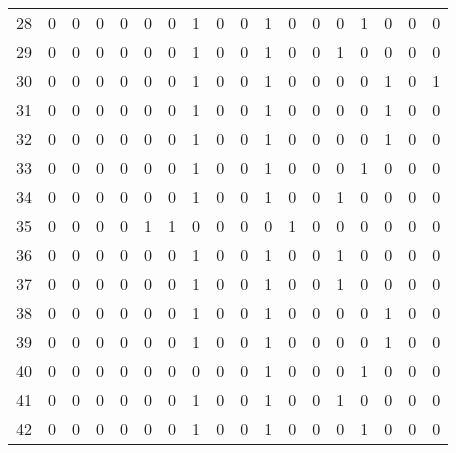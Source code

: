 \begin{tabular}{|c|c|c|c|c|c|c|c|c|c|c|c|c|c|c|c|c|c|}
28    &    0 &    0 &    0 &   0 &        0 &        0 &    1 &    0 &    0 &    1 &    0 &    0 &    0 &    1 &     0 &    0 &     0 \\
29    &    0 &    0 &    0 &   0 &        0 &        0 &    1 &    0 &    0 &    1 &    0 &    0 &    1 &    0 &     0 &    0 &     0 \\
30    &    0 &    0 &    0 &   0 &        0 &        0 &    1 &    0 &    0 &    1 &    0 &    0 &    0 &    0 &     1 &    0 &     1 \\
31    &    0 &    0 &    0 &   0 &        0 &        0 &    1 &    0 &    0 &    1 &    0 &    0 &    0 &    0 &     1 &    0 &     0 \\
32    &    0 &    0 &    0 &   0 &        0 &        0 &    1 &    0 &    0 &    1 &    0 &    0 &    0 &    0 &     1 &    0 &     0 \\
33    &    0 &    0 &    0 &   0 &        0 &        0 &    1 &    0 &    0 &    1 &    0 &    0 &    0 &    1 &     0 &    0 &     0 \\
34    &    0 &    0 &    0 &   0 &        0 &        0 &    1 &    0 &    0 &    1 &    0 &    0 &    1 &    0 &     0 &    0 &     0 \\
35    &    0 &    0 &    0 &   0 &        1 &        1 &    0 &    0 &    0 &    0 &    1 &    0 &    0 &    0 &     0 &    0 &     0 \\
36    &    0 &    0 &    0 &   0 &        0 &        0 &    1 &    0 &    0 &    1 &    0 &    0 &    1 &    0 &     0 &    0 &     0 \\
37    &    0 &    0 &    0 &   0 &        0 &        0 &    1 &    0 &    0 &    1 &    0 &    0 &    1 &    0 &     0 &    0 &     0 \\
38    &    0 &    0 &    0 &   0 &        0 &        0 &    1 &    0 &    0 &    1 &    0 &    0 &    0 &    0 &     1 &    0 &     0 \\
39    &    0 &    0 &    0 &   0 &        0 &        0 &    1 &    0 &    0 &    1 &    0 &    0 &    0 &    0 &     1 &    0 &     0 \\
40    &    0 &    0 &    0 &   0 &        0 &        0 &    0 &    0 &    0 &    1 &    0 &    0 &    0 &    1 &     0 &    0 &     0 \\
41    &    0 &    0 &    0 &   0 &        0 &        0 &    1 &    0 &    0 &    1 &    0 &    0 &    1 &    0 &     0 &    0 &     0 \\
42    &    0 &    0 &    0 &   0 &        0 &        0 &    1 &    0 &    0 &    1 &    0 &    0 &    0 &    1 &     0 &    0 &     0 \\

\end{tabular}
